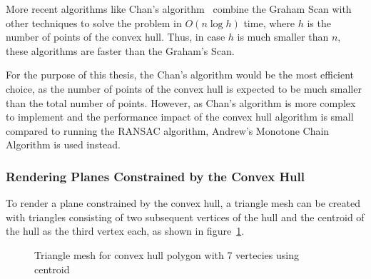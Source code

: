 More recent algorithms like Chan's algorithm~\cite{chan_optimal_1996} combine the Graham Scan with other techniques to solve the problem in $O(n \log h)$ time,
where $h$ is the number of points of the convex hull.
Thus, in case $h$ is much smaller than $n$, these algorithms are faster than the Graham's Scan.

For the purpose of this thesis, the Chan's algorithm would be the most efficient choice,
as the number of points of the convex hull is expected to be much smaller than the total number of points.
However, as Chan's algorithm is more complex to implement and the performance impact of the convex hull algorithm
is small compared to running the RANSAC algorithm, Andrew's Monotone Chain Algorithm is used instead.

\subsubsection{Rendering Planes Constrained by the Convex Hull}
To render a plane constrained by the convex hull,
a triangle mesh can be created with triangles consisting of two subsequent vertices
of the hull and the centroid of the hull as the third vertex each, as shown in figure~\ref{fig:convex-hull-mesh}.
\begin{figure}[h!tbp]
    \centering
    \caption{Triangle mesh for convex hull polygon with 7 vertecies using centroid}
    \label{fig:convex-hull-mesh}
\end{figure}

